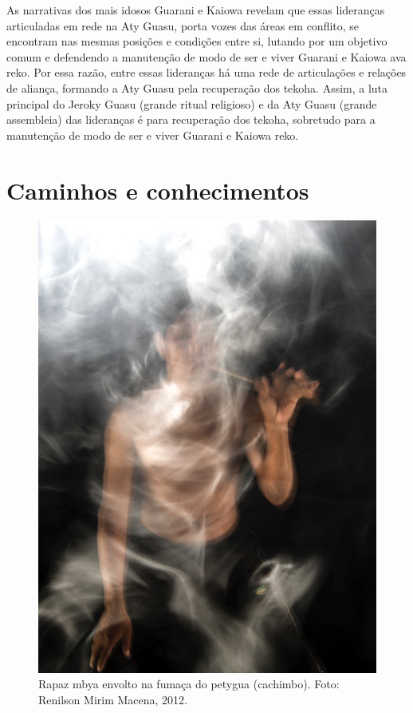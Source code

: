 As narrativas dos mais idosos Guarani e Kaiowa revelam que essas
lideranças articuladas em rede na Aty Guasu, porta vozes das áreas em
conflito, se encontram nas mesmas posições e condições entre si,
lutando por um objetivo comum e defendendo a manutenção de modo de ser
e viver Guarani e Kaiowa ava reko. Por essa razão, entre essas
lideranças há uma rede de articulações e relações de aliança, formando
a Aty Guasu pela recuperação dos tekoha. Assim, a luta principal do
Jeroky Guasu (grande ritual religioso) e da Aty Guasu (grande
assembleia) das lideranças é para recuperação dos tekoha, sobretudo
para a manutenção de modo de ser e viver Guarani e Kaiowa reko.

\part{Caminhos e conhecimentos}

 \begin{figure}
  \centering
 \includegraphics[width=\textwidth]{./img/GUARANIS-img3.jpg}	
  \hfill
  \caption{Rapaz mbya envolto na fumaça do petygua (cachimbo). Foto: Renilson
Mirim Macena, 2012.}
\end{figure}




